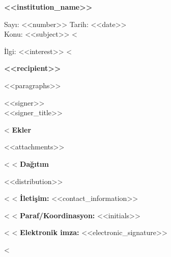 \documentclass[11pt,a4paper]{article}
\begin{document}
\begin{center}{\bfseries <<institution_name>>}\end{center}
\noindent Sayı: <<number>> \hfill Tarih: <<date>>\\
\noindent Konu: <<subject>>
<%
\par\noindent İlgi: <<interest>>
<%
\vspace{6mm}
\begin{center}\bfseries <<recipient>>\end{center}
<<paragraphs>>
\vspace{10mm}
\begin{flushright}<<signer>>\\<<signer_title>>\end{flushright}
<%
\noindent\textbf{Ekler}
\begin{enumerate}[leftmargin=*]
<<attachments>>
\end{enumerate}
<%
<%
\noindent\textbf{Dağıtım}
\begin{itemize}[leftmargin=*]
<<distribution>>
\end{itemize}
<%
<%
\noindent\textbf{İletişim:} <<contact_information>>\par
<%
<%
\noindent\textbf{Paraf/Koordinasyon:} <<initials>>\par
<%
<%
\noindent\textbf{Elektronik imza:} <<electronic_signature>>\par
<%
\end{document}
